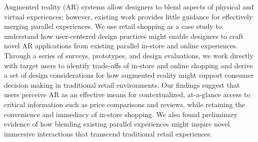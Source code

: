 Augmented reality (AR) systems allow designers to blend aspects of physical and virtual experiences; however, existing work provides little guidance for effectively merging parallel experiences. We use retail shopping as a case study to understand how user-centered design practices might enable designers to craft novel AR applications from existing parallel in-store and online experiences. Through a series of surveys, prototypes, and design evaluations, we work directly with target users to identify trade-offs of in-store and online shopping and derive a set of design considerations for how augmented reality might support consumer decision making in traditional retail environments. Our findings suggest that users perceive AR as an effective means for contextualized, at-a-glance access to critical information such as price comparisons and reviews, while retaining the convenience and immediacy of in-store shopping. We also found preliminary evidence of how blending existing parallel experiences might inspire novel immersive interactions that transcend traditional retail experiences.
